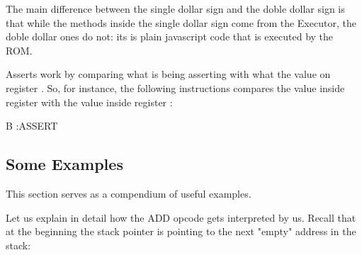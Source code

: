 The main difference between the single dollar sign and the doble dollar sign is that while the methods inside the single dollar sign come from the Executor, the doble dollar ones do not: its is plain javascript code that is executed by the ROM.

Asserts work by comparing what is being asserting with what the value on register \A. So, for instance, the following instructions compares the value inside register \B with the value inside register \A:

\begin{zkasm}
B    :ASSERT
\end{zkasm}



\subsection{Some Examples}

This section serves as a compendium of useful examples.


Let us explain in detail how the ADD opcode gets interpreted by us. Recall that at the beginning the stack pointer is pointing to the next "empty" address in the stack:

